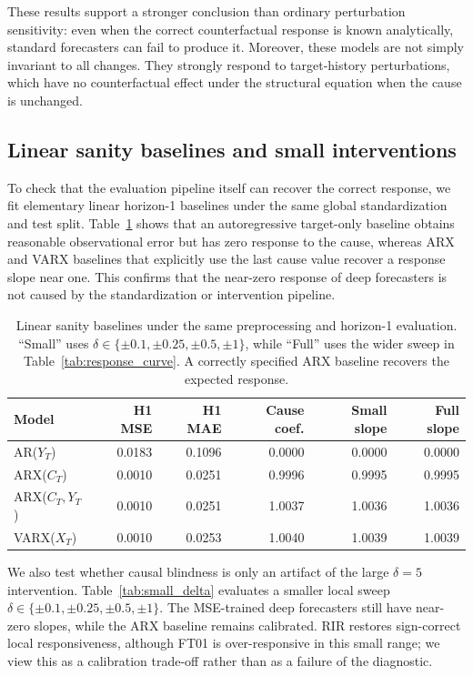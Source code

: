 \documentclass{article}
\begin{document}
These results support a stronger conclusion than ordinary perturbation sensitivity:
even when the correct counterfactual response is known analytically, standard
forecasters can fail to produce it. Moreover, these models are not simply invariant
to all changes. They strongly respond to target-history perturbations, which have no
counterfactual effect under the structural equation when the cause is unchanged.

\subsection{Linear sanity baselines and small interventions}

To check that the evaluation pipeline itself can recover the correct response, we
fit elementary linear horizon-1 baselines under the same global standardization and
test split. Table~\ref{tab:linear_sanity} shows that an autoregressive target-only
baseline obtains reasonable observational error but has zero response to the cause,
whereas ARX and VARX baselines that explicitly use the last cause value recover a
response slope near one. This confirms that the near-zero response of deep
forecasters is not caused by the standardization or intervention pipeline.

\begin{table}[t]
\centering
\caption{Linear sanity baselines under the same preprocessing and horizon-1
evaluation. ``Small'' uses $\delta \in \{\pm0.1,\pm0.25,\pm0.5,\pm1\}$, while
``Full'' uses the wider sweep in Table~\ref{tab:response_curve}. A correctly
specified ARX baseline recovers the expected response.}
\label{tab:linear_sanity}
\begin{tabular}{lrrrrr}
\toprule
Model & H1 MSE & H1 MAE & Cause coef. & Small slope & Full slope \\
\midrule
AR($Y_T$) & 0.0183 & 0.1096 & 0.0000 & 0.0000 & 0.0000 \\
ARX($C_T$) & 0.0010 & 0.0251 & 0.9996 & 0.9995 & 0.9995 \\
ARX($C_T,Y_T$) & 0.0010 & 0.0251 & 1.0037 & 1.0036 & 1.0036 \\
VARX($X_T$) & 0.0010 & 0.0253 & 1.0040 & 1.0039 & 1.0039 \\
\bottomrule
\end{tabular}
\end{table}

We also test whether causal blindness is only an artifact of the large $\delta=5$
intervention. Table~\ref{tab:small_delta} evaluates a smaller local sweep
$\delta \in \{\pm0.1,\pm0.25,\pm0.5,\pm1\}$. The MSE-trained deep forecasters still
have near-zero slopes, while the ARX baseline remains calibrated. RIR restores
sign-correct local responsiveness, although FT01 is over-responsive in this small
range; we view this as a calibration trade-off rather than as a failure of the
diagnostic.
\end{document}
